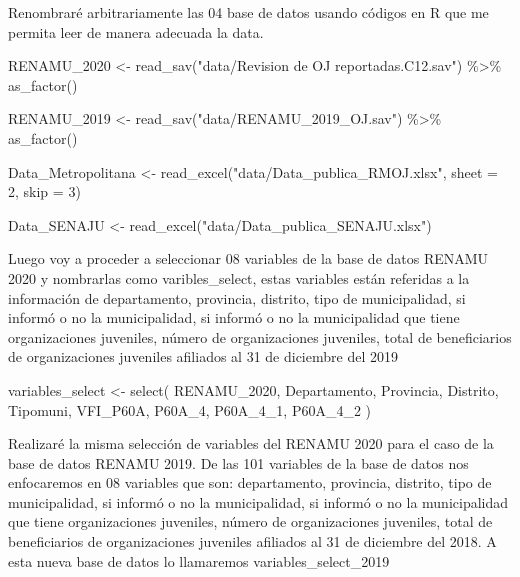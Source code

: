 \documentclass[
]{book}
\newenvironment{Shaded}{\begin{snugshade}}{\end{snugshade}}
\newcommand{\AttributeTok}[1]{\textcolor[rgb]{0.77,0.63,0.00}{#1}}
\newcommand{\DecValTok}[1]{\textcolor[rgb]{0.00,0.00,0.81}{#1}}
\newcommand{\FunctionTok}[1]{\textcolor[rgb]{0.00,0.00,0.00}{#1}}
\newcommand{\NormalTok}[1]{#1}
\newcommand{\OtherTok}[1]{\textcolor[rgb]{0.56,0.35,0.01}{#1}}
\newcommand{\SpecialCharTok}[1]{\textcolor[rgb]{0.00,0.00,0.00}{#1}}
\newcommand{\StringTok}[1]{\textcolor[rgb]{0.31,0.60,0.02}{#1}}
\begin{document}
Renombraré arbitrariamente las 04 base de datos usando códigos en R que me permita leer de manera adecuada la data.

\begin{Shaded}
\begin{Highlighting}[]
\NormalTok{RENAMU\_2020 }\OtherTok{\textless{}{-}} \FunctionTok{read\_sav}\NormalTok{(}\StringTok{"data/Revision de OJ reportadas.C12.sav"}\NormalTok{) }\SpecialCharTok{\%\textgreater{}\%} 
  \FunctionTok{as\_factor}\NormalTok{()}

\NormalTok{RENAMU\_2019 }\OtherTok{\textless{}{-}} \FunctionTok{read\_sav}\NormalTok{(}\StringTok{"data/RENAMU\_2019\_OJ.sav"}\NormalTok{) }\SpecialCharTok{\%\textgreater{}\%} 
  \FunctionTok{as\_factor}\NormalTok{()}

\NormalTok{Data\_Metropolitana }\OtherTok{\textless{}{-}} \FunctionTok{read\_excel}\NormalTok{(}\StringTok{"data/Data\_publica\_RMOJ.xlsx"}\NormalTok{,}
             \AttributeTok{sheet =} \DecValTok{2}\NormalTok{,}
             \AttributeTok{skip =} \DecValTok{3}\NormalTok{)}

\NormalTok{Data\_SENAJU }\OtherTok{\textless{}{-}} \FunctionTok{read\_excel}\NormalTok{(}\StringTok{"data/Data\_publica\_SENAJU.xlsx"}\NormalTok{)}
\end{Highlighting}
\end{Shaded}

Luego voy a proceder a seleccionar 08 variables de la base de datos RENAMU 2020 y nombrarlas como varibles\_select, estas variables están referidas a la información de departamento, provincia, distrito, tipo de municipalidad, si informó o no la municipalidad, si informó o no la municipalidad que tiene organizaciones juveniles, número de organizaciones juveniles, total de beneficiarios de organizaciones juveniles afiliados al 31 de diciembre del 2019

\begin{Shaded}
\begin{Highlighting}[]
\NormalTok{variables\_select }\OtherTok{\textless{}{-}}
  \FunctionTok{select}\NormalTok{(}
\NormalTok{    RENAMU\_2020,}
\NormalTok{    Departamento,}
\NormalTok{    Provincia,}
\NormalTok{    Distrito,}
\NormalTok{    Tipomuni,}
\NormalTok{    VFI\_P60A,}
\NormalTok{    P60A\_4,}
\NormalTok{    P60A\_4\_1,}
\NormalTok{    P60A\_4\_2}
\NormalTok{  )}
\end{Highlighting}
\end{Shaded}

Realizaré la misma selección de variables del RENAMU 2020 para el caso de la base de datos RENAMU 2019. De las 101 variables de la base de datos nos enfocaremos en 08 variables que son: departamento, provincia, distrito, tipo de municipalidad, si informó o no la municipalidad, si informó o no la municipalidad que tiene organizaciones juveniles, número de organizaciones juveniles, total de beneficiarios de organizaciones juveniles afiliados al 31 de diciembre del 2018. A esta nueva base de datos lo llamaremos variables\_select\_2019
\end{document}
